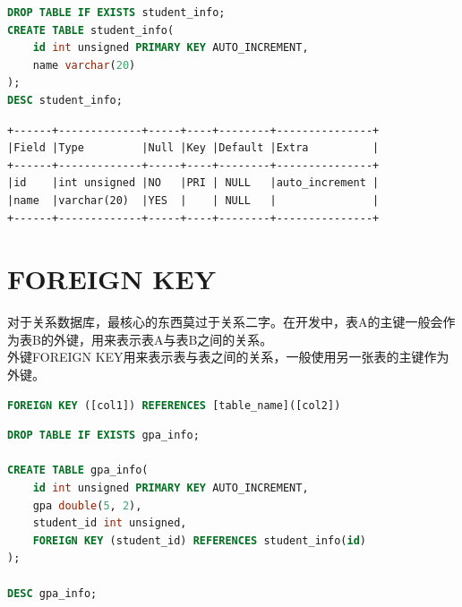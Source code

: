 \documentclass[12pt, openany, oneside]{book}
\begin{document}

\begin{lstlisting}[language=SQL]
DROP TABLE IF EXISTS student_info;
CREATE TABLE student_info(
	id int unsigned PRIMARY KEY AUTO_INCREMENT,
	name varchar(20)
);
DESC student_info;
\end{lstlisting}

\begin{tcolorbox}
\begin{verbatim}
+------+-------------+-----+----+--------+---------------+
|Field |Type         |Null |Key |Default |Extra          |
+------+-------------+-----+----+--------+---------------+
|id    |int unsigned |NO   |PRI | NULL   |auto_increment |
|name  |varchar(20)  |YES  |    | NULL   |               |
+------+-------------+-----+----+--------+---------------+
	\end{verbatim}
\end{tcolorbox}

\vspace{0.5cm}

\section{FOREIGN KEY}

对于关系数据库，最核心的东西莫过于关系二字。在开发中，表A的主键一般会作为表B的外键，用来表示表A与表B之间的关系。\\

外键FOREIGN KEY用来表示表与表之间的关系，一般使用另一张表的主键作为外键。

\vspace{-0.5cm}

\begin{lstlisting}[language=SQL]
FOREIGN KEY ([col1]) REFERENCES [table_name]([col2])
\end{lstlisting}

\vspace{0.5cm}


\begin{lstlisting}[language=SQL]
DROP TABLE IF EXISTS gpa_info;

CREATE TABLE gpa_info(
    id int unsigned PRIMARY KEY AUTO_INCREMENT,
    gpa double(5, 2),
    student_id int unsigned,
    FOREIGN KEY (student_id) REFERENCES student_info(id)
);

DESC gpa_info;
\end{lstlisting}
\end{document}
